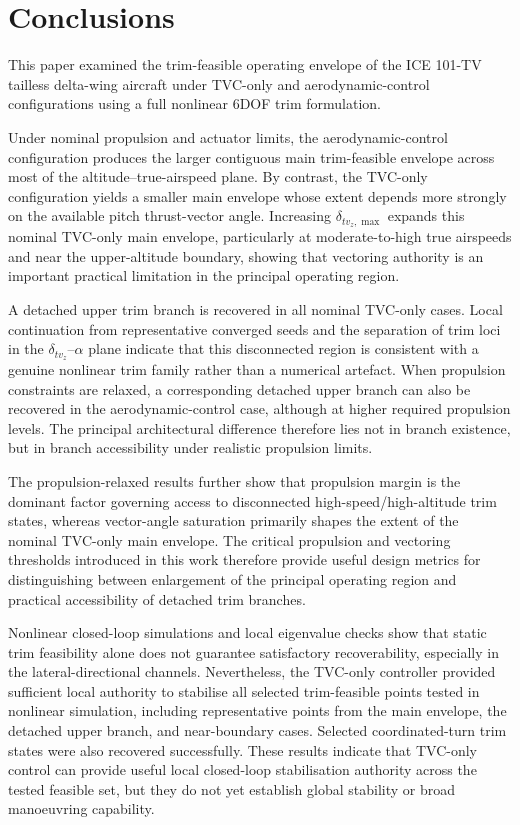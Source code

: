\documentclass[conf]{new-aiaa}
\begin{document}
\section{Conclusions}\label{sec:conclusions}
This paper examined the trim-feasible operating envelope of the ICE 101-TV tailless delta-wing aircraft under TVC-only and aerodynamic-control configurations using a full nonlinear 6DOF trim formulation.

Under nominal propulsion and actuator limits, the aerodynamic-control configuration produces the larger contiguous main trim-feasible envelope across most of the altitude--true-airspeed plane. By contrast, the TVC-only configuration yields a smaller main envelope whose extent depends more strongly on the available pitch thrust-vector angle. Increasing $\delta_{tv_z,\max}$ expands this nominal TVC-only main envelope, particularly at moderate-to-high true airspeeds and near the upper-altitude boundary, showing that vectoring authority is an important practical limitation in the principal operating region.

A detached upper trim branch is recovered in all nominal TVC-only cases. Local continuation from representative converged seeds and the separation of trim loci in the $\delta_{tv_z}$--$\alpha$ plane indicate that this disconnected region is consistent with a genuine nonlinear trim family rather than a numerical artefact. When propulsion constraints are relaxed, a corresponding detached upper branch can also be recovered in the aerodynamic-control case, although at higher required propulsion levels. The principal architectural difference therefore lies not in branch existence, but in branch accessibility under realistic propulsion limits.

The propulsion-relaxed results further show that propulsion margin is the dominant factor governing access to disconnected high-speed/high-altitude trim states, whereas vector-angle saturation primarily shapes the extent of the nominal TVC-only main envelope. The critical propulsion and vectoring thresholds introduced in this work therefore provide useful design metrics for distinguishing between enlargement of the principal operating region and practical accessibility of detached trim branches.

Nonlinear closed-loop simulations and local eigenvalue checks show that static trim feasibility alone does not guarantee satisfactory recoverability, especially in the lateral-directional channels. Nevertheless, the TVC-only controller provided sufficient local authority to stabilise all selected trim-feasible points tested in nonlinear simulation, including representative points from the main envelope, the detached upper branch, and near-boundary cases. Selected coordinated-turn trim states were also recovered successfully. These results indicate that TVC-only control can provide useful local closed-loop stabilisation authority across the tested feasible set, but they do not yet establish global stability or broad manoeuvring capability.
\end{document}
